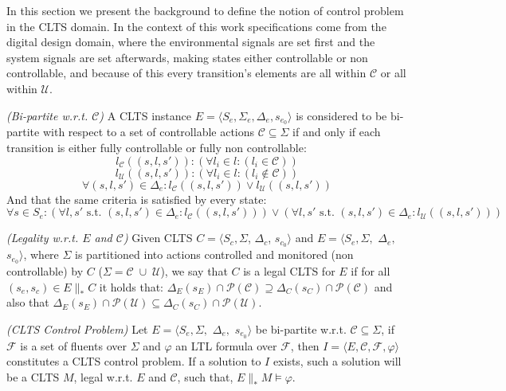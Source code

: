 In this section we present the background to define the notion of control problem in the CLTS domain.  In the context of this work specifications come from the digital design domain, where the environmental signals are set first and the system signals are set afterwards, making states either controllable or non controllable, and because of this every transition's elements are all within $\mathcal{C}$ or all within $\mathcal{U}$. 

\begin{definition}\label{def:bi-partite_clts} \emph{(Bi-partite w.r.t. $\mathcal{C}$)} 
A CLTS instance $E=\langle S_e, \Sigma_e, \Delta_e, s_{e_0} \rangle$ is considered to be bi-partite with respect to a set of controllable actions $\mathcal{C} \subseteq \Sigma$ if and only if each transition is either fully controllable or fully non controllable:
\[ l_{\mathcal{C}}((s,l,s')): ( \forall l_i \in l:(l_i \in \mathcal{C}))\]
\[ l_{\mathcal{U}}((s,l,s')): ( \forall l_i \in l:(l_i \not\in \mathcal{C}))\]
\[ \forall (s,l,s') \in \Delta_e: l_{\mathcal{C}}((s,l,s')) \vee l_{\mathcal{U}}((s,l,s')) \]
And that the same criteria is satisfied by every state:
\[ \forall s \in S_e : (\forall l, s' \text{ s.t. } (s,l,s') \in \Delta_e:l_{\mathcal{C}}((s,l,s')))\vee (\forall l, s' \text{ s.t. } (s,l,s') \in \Delta_e:l_{\mathcal{U}}((s,l,s')))\]
\end{definition}

\begin{definition}
	\label{def:legal_clts} \emph{(Legality w.r.t. $E$ and $\mathcal{C}$)} 
	Given CLTS $C = \langle S_c, \Sigma$, $\Delta_c$, $s_{c_0}\rangle$ and $E = \langle S_e,\Sigma,$ $\Delta_e,$ $s_{e_0}\rangle$, where $\Sigma$ is partitioned into actions controlled and monitored (non controllable) by $C$ ($\Sigma=\mathcal{C} \; \cup \;\mathcal{U}$), we say that $C$ is a legal CLTS for $E$ if for all $(s_e,s_c) \in E \parallel_* C$ it holds that:
	$\Delta_{E}(s_E)\cap \mathcal{P}(\mathcal{C}) \supseteq \Delta_{C}(s_C)\cap \mathcal{P}(\mathcal{C})$ and also that  $\Delta_{E}(s_E)\cap \mathcal{P}(\mathcal{U}) \subseteq \Delta_{C}(s_C)\cap \mathcal{P}(\mathcal{U})$.
\end{definition}

\begin{definition}
	\label{def:clts_control_problem} \emph{(CLTS Control Problem)} 
	Let $E = \langle S_e,\Sigma,$ $\Delta_e,$ $s_{e_0}\rangle $ be bi-partite w.r.t. $\mathcal{C} \subseteq \Sigma$, if $\mathcal{F}$ is a set of fluents over $\Sigma$ and $\varphi$ an LTL formula over $\mathcal{F}$, then $I = \langle E, \mathcal{C}, \mathcal{F}, \varphi \rangle$ constitutes a CLTS control problem. If a solution to $I$ exists, such a solution will be a CLTS $M$, legal w.r.t. $E$ and $\mathcal{C}$, such that, $E \parallel_* M \models \varphi$.
\end{definition}
